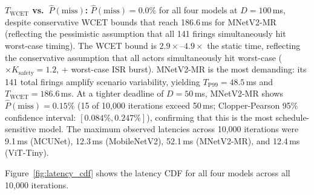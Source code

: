 \documentclass[journal]{IEEEtran}
\begin{document}
\begin{table}[htbp]
\centering
\caption{Monte Carlo Simulation ($N = 10{,}000$, Cortex-M7, $D = 100$\,ms). $T_{\mathrm{WCET}}$ is the analytical bound from Eq.~\ref{eq:wcet}, not a simulation output. MNetV2-MR is the only multi-rate model, with 141 total firings amplifying scenario variability. $T_{\mathrm{mean}}/T_{\mathrm{static}}$ quantifies the average overhead from stochastic scenarios.}
\label{tab:dynamic}
\end{table}

\textbf{$T_{\mathrm{WCET}}$ vs.\ $\hat{P}(\mathrm{miss})$:}
$\hat{P}(\mathrm{miss}) = 0.0\%$ for all four models at $D = 100$\,ms, despite conservative WCET bounds that reach 186.6\,ms for MNetV2-MR (reflecting the pessimistic assumption that all 141 firings simultaneously hit worst-case timing).
The WCET bound is $2.9\times$--$4.9\times$ the static time, reflecting the conservative assumption that all actors simultaneously hit worst-case ($\times K_{\mathrm{safety}} = 1.2$, + worst-case ISR burst).
MNetV2-MR is the most demanding: its 141 total firings amplify scenario variability, yielding $T_{\mathrm{P99}} = 48.5$\,ms and $T_{\mathrm{WCET}} = 186.6$\,ms.
At a tighter deadline of $D = 50$\,ms, MNetV2-MR shows $\hat{P}(\mathrm{miss}) = 0.15\%$ (15 of 10{,}000 iterations exceed 50\,ms; Clopper-Pearson 95\% confidence interval: $[0.084\%, 0.247\%]$), confirming that this is the most schedule-sensitive model.
The maximum observed latencies across 10{,}000 iterations were 9.1\,ms (MCUNet), 12.3\,ms (MobileNetV2), 52.1\,ms (MNetV2-MR), and 12.4\,ms (ViT-Tiny).

Figure~\ref{fig:latency_cdf} shows the latency CDF for all four models across all 10{,}000 iterations.
\end{document}
